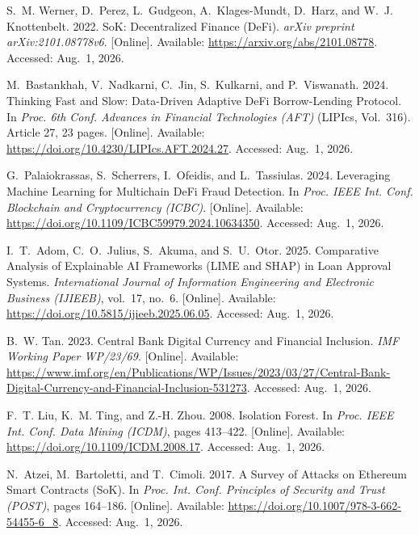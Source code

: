 {\small
\begin{enumerate}[label={[\arabic*]}]
\item S.~M. Werner, D.~Perez, L.~Gudgeon, A.~Klages-Mundt, D.~Harz, and W.~J. Knottenbelt. 2022. SoK: Decentralized Finance (DeFi). \emph{arXiv preprint arXiv:2101.08778v6}. [Online]. Available: \url{https://arxiv.org/abs/2101.08778}. Accessed: Aug.~1, 2026.

\item M.~Bastankhah, V.~Nadkarni, C.~Jin, S.~Kulkarni, and P.~Viswanath. 2024. Thinking Fast and Slow: Data-Driven Adaptive DeFi Borrow-Lending Protocol. In \emph{Proc. 6th Conf. Advances in Financial Technologies (AFT)} (LIPIcs, Vol.~316). Article 27, 23 pages. [Online]. Available: \url{https://doi.org/10.4230/LIPIcs.AFT.2024.27}. Accessed: Aug.~1, 2026.

\item G.~Palaiokrassas, S.~Scherrers, I.~Ofeidis, and L.~Tassiulas. 2024. Leveraging Machine Learning for Multichain DeFi Fraud Detection. In \emph{Proc. IEEE Int. Conf. Blockchain and Cryptocurrency (ICBC)}. [Online]. Available: \url{https://doi.org/10.1109/ICBC59979.2024.10634350}. Accessed: Aug.~1, 2026.

\item I.~T.~Adom, C.~O.~Julius, S.~Akuma, and S.~U.~Otor. 2025. Comparative Analysis of Explainable AI Frameworks (LIME and SHAP) in Loan Approval Systems. \emph{International Journal of Information Engineering and Electronic Business (IJIEEB)}, vol.~17, no.~6. [Online]. Available: \url{https://doi.org/10.5815/ijieeb.2025.06.05}. Accessed: Aug.~1, 2026.

\item B.~W. Tan. 2023. Central Bank Digital Currency and Financial Inclusion. \emph{IMF Working Paper WP/23/69}. [Online]. Available: \url{https://www.imf.org/en/Publications/WP/Issues/2023/03/27/Central-Bank-Digital-Currency-and-Financial-Inclusion-531273}. Accessed: Aug.~1, 2026.

\item F.~T. Liu, K.~M. Ting, and Z.-H. Zhou. 2008. Isolation Forest. In \emph{Proc. IEEE Int. Conf. Data Mining (ICDM)}, pages 413--422. [Online]. Available: \url{https://doi.org/10.1109/ICDM.2008.17}. Accessed: Aug.~1, 2026.

\item N.~Atzei, M.~Bartoletti, and T.~Cimoli. 2017. A Survey of Attacks on Ethereum Smart Contracts (SoK). In \emph{Proc. Int. Conf. Principles of Security and Trust (POST)}, pages 164--186. [Online]. Available: \url{https://doi.org/10.1007/978-3-662-54455-6_8}. Accessed: Aug.~1, 2026.


\end{enumerate}}
